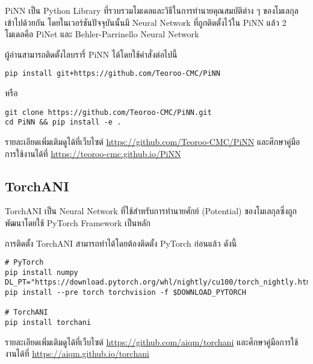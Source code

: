 PiNN\autocite{shao2020} เป็น Python Library ที่รวบรวมโมเดลและวิธีในการทำนายคุณสมบัติต่าง ๆ ของโมเลกุลเข้าไปด้วยกัน โดยในเวอร์ชันปัจจุบันนั้นมี Neural Network ที่ถูกติดตั้งไว้ใน PiNN แล้ว 2 โมเดลคือ PiNet และ Behler-Parrinello Neural Network

\noindent ผู้อ่านสามารถติดตั้งไลบรารี่ PiNN ได้โดยใช้คำสั่งต่อไปนี้

\begin{lstlisting}[style=MyBash]
pip install git+https://github.com/Teoroo-CMC/PiNN
\end{lstlisting}

\noindent หรือ

\begin{lstlisting}[style=MyBash]
git clone https://github.com/Teoroo-CMC/PiNN.git 
cd PiNN && pip install -e .
\end{lstlisting}

รายละเอียดเพิ่มเติมดูได้ที่เว็บไซต์ \url{https://github.com/Teoroo-CMC/PiNN} และศึกษาคู่มือการใช้งานได้ที่ \url{https://teoroo-cmc.github.io/PiNN}

\subsection{TorchANI}
\label{ssec:lib_torchani}

TorchANI\autocite{gao2020} เป็น Neural Network ที่ใช้สำหรับการทำนายศักย์ (Potential) ของโมเลกุลซึ่งถูกพัฒนาโดยใช้ PyTorch Framework เป็นหลัก 

\noindent การติดตั้ง TorchANI สามารถทำได้โดยต้องติดตั้ง PyTorch ก่อนแล้ว ดังนี้

\begin{lstlisting}[style=MyBash]
# PyTorch
pip install numpy
DL_PT="https://download.pytorch.org/whl/nightly/cu100/torch_nightly.html"
pip install --pre torch torchvision -f $DOWNLOAD_PYTORCH

# TorchANI
pip install torchani
\end{lstlisting}

รายละเอียดเพิ่มเติมดูได้ที่เว็บไซต์ \url{https://github.com/aiqm/torchani} และศึกษาคู่มือการใช้งานได้ที่ 
\url{https://aiqm.github.io/torchani}
